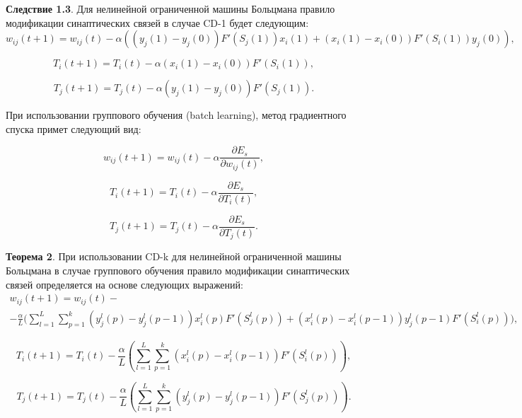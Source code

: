 \textbf{Следствие 1.3}. Для нелинейной ограниченной машины Больцмана правило модификации синаптических связей в случае CD-1 будет следующим:	
\begin{equation*}
    w_{ij}(t+1)=w_{ij}(t)-\alpha((y_j(1)-y_j(0))F'(S_j(1))x_i(1)+(x_i(1)-x_i(0))F'(S_i(1))y_j(0)),
\end{equation*}

\begin{equation*}
    T_i(t+1)=T_i(t)-\alpha(x_i(1)-x_i(0))F'(S_i(1)),
\end{equation*}

\begin{equation*}
    T_j(t+1)=T_j(t)-\alpha(y_j(1)-y_j(0))F'(S_j(1)).  
\end{equation*}

При использовании группового обучения (batch learning), метод градиентного спуска примет следующий вид:

\begin{equation}
    w_{ij}(t+1)=w_{ij}(t)-\alpha\frac{\partial E_s}{\partial w_{ij}(t)},
\end{equation}

\begin{equation}
    T_{i}(t+1)=T_{i}(t)-\alpha\frac{\partial E_s}{\partial T_{i}(t)},
\end{equation}

\begin{equation}
    T_{j}(t+1)=T_{j}(t)-\alpha\frac{\partial E_s}{\partial T_{j}(t)}.
\end{equation}

\textbf{Теорема 2}. При использовании  CD-k для нелинейной ограниченной машины Больцмана в случае группового обучения правило модификации синаптических связей определяется на основе следующих выражений:
\begin{multline*}
    w_{ij}(t+1)=w_{ij}(t)-\\-\frac{\alpha}{L}\Bigg(\sum_{l=1}^L\sum_{p=1}^k (y_j^l(p)-y_j^l(p-1))x_i^l(p)F'(S_j^l(p))+(x_i^l(p)-x_i^l(p-1))y_j^l(p-1)F'(S_i^l(p))\Bigg),
\end{multline*}

\begin{equation*}
    T_{i}(t+1)=T_{i}(t)-\frac{\alpha}{L}\left(\sum_{l=1}^L\sum_{p=1}^k (x_i^l(p)-x_i^l(p-1))F'(S_i^l(p))\right),
\end{equation*}

\begin{equation*}
    T_{j}(t+1)=T_{j}(t)-\frac{\alpha}{L}\left(\sum_{l=1}^L\sum_{p=1}^k (y_j^l(p)-y_j^l(p-1))F'(S_j^l(p))\right).
\end{equation*}

